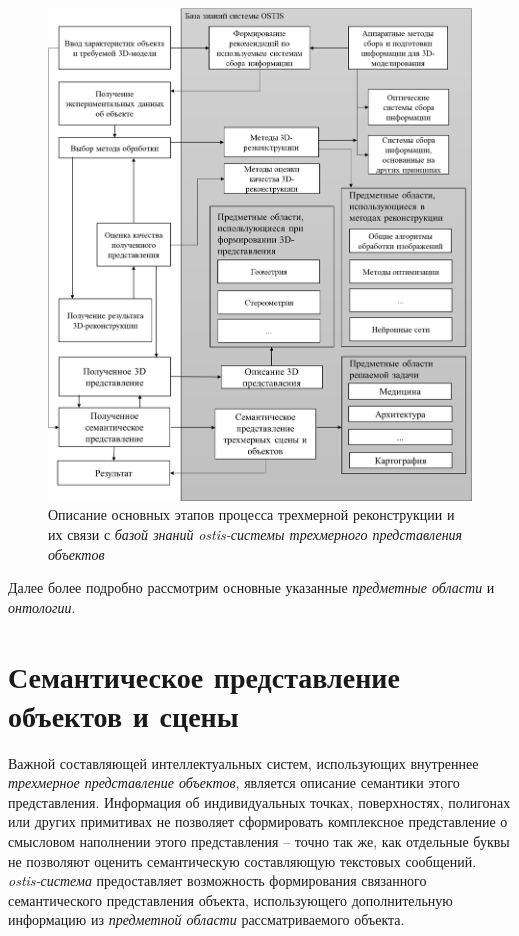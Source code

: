 \begin{figure}[H]
    \includegraphics[scale=0.3]{author/part4/figures/schema3D.png}
    \caption{Описание основных этапов процесса трехмерной реконструкции и их связи с \textit{базой знаний} \textit{ostis-системы трехмерного представления объектов}}
    \label{fig:schema-3d-reconstruction}
\end{figure}

Далее более подробно рассмотрим основные указанные \textit{предметные области} и \textit{онтологии}.

\section{Семантическое представление объектов и сцены}
\label{sec_3d_models_semantics}

Важной составляющей интеллектуальных систем, использующих внутреннее \textit{трехмерное представление объектов}, является описание семантики этого представления. Информация об индивидуальных точках, поверхностях, полигонах или других примитивах не позволяет сформировать комплексное представление о смысловом наполнении этого представления -- точно так же, как отдельные буквы не позволяют оценить семантическую составляющую текстовых сообщений. \textit{ostis-система} предоставляет возможность формирования связанного семантического представления объекта, использующего дополнительную информацию из \textit{предметной области} рассматриваемого объекта.

